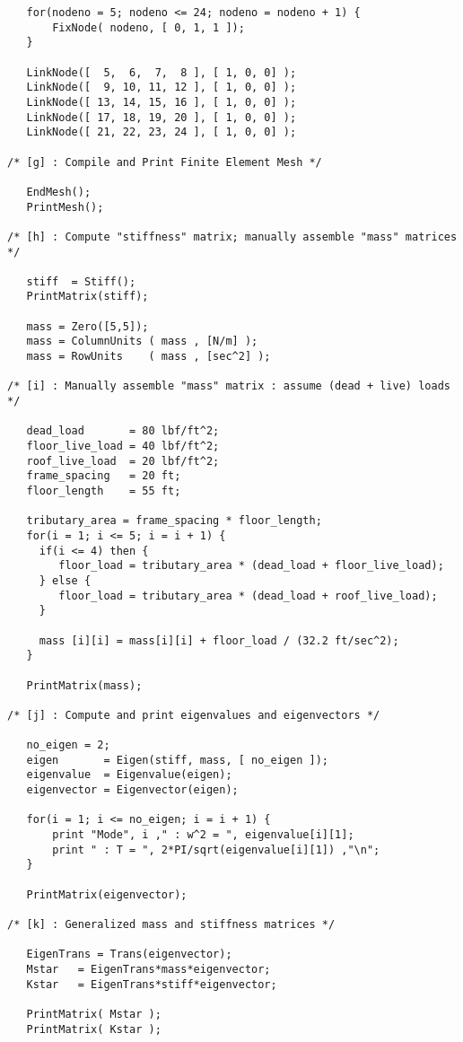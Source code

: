 \begin{footnotesize}
\begin{verbatim}
   for(nodeno = 5; nodeno <= 24; nodeno = nodeno + 1) {
       FixNode( nodeno, [ 0, 1, 1 ]);
   }

   LinkNode([  5,  6,  7,  8 ], [ 1, 0, 0] );
   LinkNode([  9, 10, 11, 12 ], [ 1, 0, 0] );
   LinkNode([ 13, 14, 15, 16 ], [ 1, 0, 0] );
   LinkNode([ 17, 18, 19, 20 ], [ 1, 0, 0] );
   LinkNode([ 21, 22, 23, 24 ], [ 1, 0, 0] );

/* [g] : Compile and Print Finite Element Mesh */

   EndMesh();
   PrintMesh();

/* [h] : Compute "stiffness" matrix; manually assemble "mass" matrices */

   stiff  = Stiff();
   PrintMatrix(stiff);

   mass = Zero([5,5]);
   mass = ColumnUnits ( mass , [N/m] );
   mass = RowUnits    ( mass , [sec^2] );

/* [i] : Manually assemble "mass" matrix : assume (dead + live) loads */

   dead_load       = 80 lbf/ft^2;
   floor_live_load = 40 lbf/ft^2;
   roof_live_load  = 20 lbf/ft^2;
   frame_spacing   = 20 ft;
   floor_length    = 55 ft;

   tributary_area = frame_spacing * floor_length;
   for(i = 1; i <= 5; i = i + 1) {
     if(i <= 4) then {
        floor_load = tributary_area * (dead_load + floor_live_load);
     } else {
        floor_load = tributary_area * (dead_load + roof_live_load);
     }

     mass [i][i] = mass[i][i] + floor_load / (32.2 ft/sec^2);
   }

   PrintMatrix(mass);

/* [j] : Compute and print eigenvalues and eigenvectors */

   no_eigen = 2;
   eigen       = Eigen(stiff, mass, [ no_eigen ]);
   eigenvalue  = Eigenvalue(eigen);
   eigenvector = Eigenvector(eigen);

   for(i = 1; i <= no_eigen; i = i + 1) {
       print "Mode", i ," : w^2 = ", eigenvalue[i][1];
       print " : T = ", 2*PI/sqrt(eigenvalue[i][1]) ,"\n";
   }

   PrintMatrix(eigenvector);

/* [k] : Generalized mass and stiffness matrices */

   EigenTrans = Trans(eigenvector);
   Mstar   = EigenTrans*mass*eigenvector;
   Kstar   = EigenTrans*stiff*eigenvector;

   PrintMatrix( Mstar );
   PrintMatrix( Kstar );


\end{verbatim}
\end{footnotesize}
